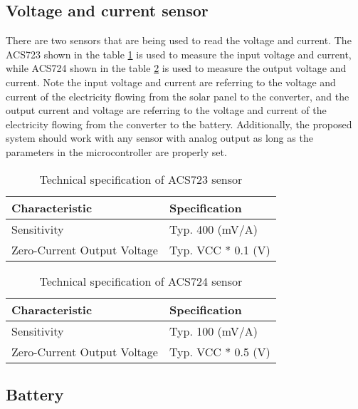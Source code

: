 \documentclass[../thesis.tex]{subfiles}
\begin{document}
\subsection{Voltage and current sensor}

There are two sensors that are being used to read the voltage and current. The ACS723 shown in the table \ref{tab:acs723} is used to measure the input voltage and current, while ACS724 shown in the table \ref{tab:acs724} is used to measure the output voltage and current. Note the input voltage and current are referring to the voltage and current of the electricity flowing from the solar panel to the converter, and the output current and voltage are referring to the voltage and current of the electricity flowing from the converter to the battery. Additionally, the proposed system should work with any sensor with analog output as long as the parameters in the microcontroller are properly set.

\begin{table}[h!]
	\begin{center}
		\caption{Technical specification of ACS723 sensor}
		\label{tab:acs723}
		\begin{tabular}{l|l}
			\toprule
			\textbf{Characteristic} & \textbf{Specification}\\
			\midrule
			Sensitivity & Typ. 400 (mV/A)\\
			Zero-Current Output Voltage & Typ. VCC * 0.1 (V)\\
			\bottomrule
		\end{tabular}
	\end{center}
\end{table}

\begin{table}[h!]
	\begin{center}
		\caption{Technical specification of ACS724 sensor}
		\label{tab:acs724}
		\begin{tabular}{l|l}
			\toprule
			\textbf{Characteristic} & \textbf{Specification}\\
			\midrule
			Sensitivity & Typ. 100 (mV/A)\\
			Zero-Current Output Voltage & Typ. VCC * 0.5 (V)\\
			\bottomrule
		\end{tabular}
	\end{center}
\end{table}

\subsection{Battery}
\end{document}
